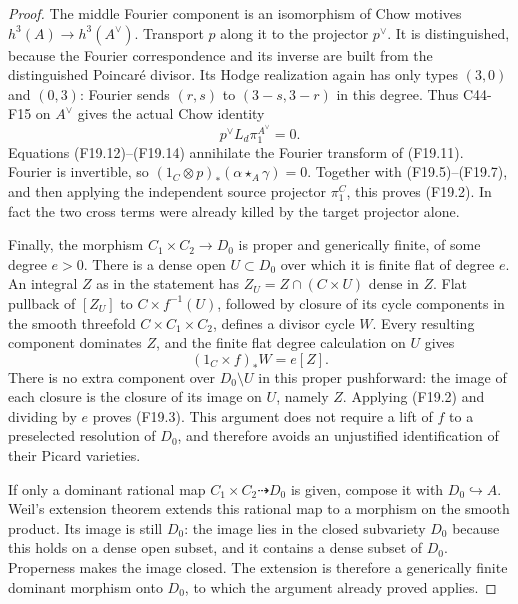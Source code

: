 \documentclass[11pt]{article}
\theoremstyle{remark}\newtheorem{remark}[theorem]{Remark}
\begin{document}
\begin{proof}
The middle Fourier component is an isomorphism of Chow
motives $h^3(A)\to h^3(A^\vee)$.  Transport $p$ along it
to the projector $p^\vee$.  It is distinguished, because
the Fourier correspondence and its inverse are built
from the distinguished Poincar\'e divisor.  Its Hodge
realization again has only types $(3,0)$ and $(0,3)$:
Fourier sends $(r,s)$ to $(3-s,3-r)$ in this degree.
Thus C44-F15 on $A^\vee$ gives the actual Chow identity
\[
                   p^\vee L_d\pi_1^{A^\vee}=0.
 \tag{F19.14}
\]
Equations (F19.12)--(F19.14) annihilate the Fourier
transform of (F19.11).  Fourier is invertible, so
$(1_C\otimes p)_*(\alpha\star_A\gamma)=0$.
Together with (F19.5)--(F19.7), and then applying the
independent source projector $\pi_1^C$, this proves
(F19.2).  In fact the two cross terms were already
killed by the target projector alone.

Finally, the morphism $C_1\times C_2\to D_0$ is proper
and generically finite, of some degree $e>0$.  There is
a dense open $U\subset D_0$ over which it is finite
flat of degree $e$.  An integral $Z$ as in the statement
has $Z_U=Z\cap(C\times U)$ dense in $Z$.
Flat pullback of $[Z_U]$ to
$C\times f^{-1}(U)$, followed by closure of its cycle
components in the smooth threefold
$C\times C_1\times C_2$, defines a divisor cycle $W$.
Every resulting component dominates $Z$, and the finite
flat degree calculation on $U$ gives
\[
                            (1_C\times f)_*W=e[Z].
 \tag{F19.15}
\]
There is no extra component over $D_0\setminus U$ in
this proper pushforward: the image of each closure is
the closure of its image on $U$, namely $Z$.
Applying (F19.2) and dividing by $e$ proves (F19.3).
This argument does not require a lift of $f$ to a
preselected resolution of $D_0$, and therefore avoids
an unjustified identification of their Picard varieties.

If only a dominant rational map $C_1\times C_2\dashrightarrow
D_0$ is given, compose it with $D_0\hookrightarrow A$.
Weil's extension theorem extends this rational map to a
morphism on the smooth product.  Its image is still $D_0$:
the image lies in the closed subvariety $D_0$ because this
holds on a dense open subset, and it contains a dense subset
of $D_0$.  Properness makes the image closed.  The extension
is therefore a generically finite dominant morphism onto
$D_0$, to which the argument already proved applies.
\end{proof}
\end{document}

